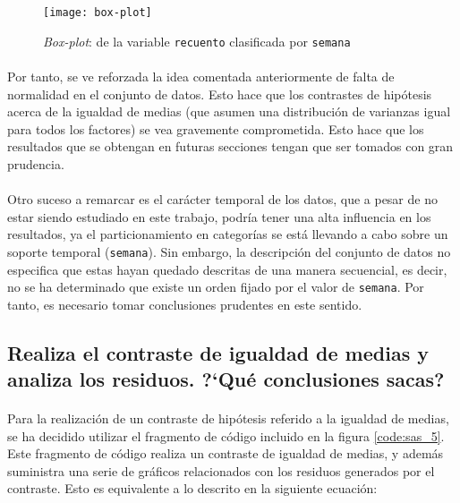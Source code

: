 \documentclass[11pt]{article}
\begin{document}
      \begin{figure}
        \centering
        \texttt{[image: box-plot]}
        \caption{\emph{Box-plot}: de la variable \texttt{recuento} clasificada por \texttt{semana}}
        \label{img:box-plot}
      \end{figure}

      \paragraph{}
      Por tanto, se ve reforzada la idea comentada anteriormente de falta de normalidad en el conjunto de datos. Esto hace que los contrastes de hipótesis acerca de la igualdad de medias (que asumen una distribución de varianzas igual para todos los factores) se vea gravemente comprometida. Esto hace que los resultados que se obtengan en futuras secciones tengan que ser tomados con gran prudencia.

      \paragraph{}
      Otro suceso a remarcar es el carácter temporal de los datos, que a pesar de no estar siendo estudiado en este trabajo, podría tener una alta influencia en los resultados, ya el particionamiento en categorías se está llevando a cabo sobre un soporte temporal (\texttt{semana}). Sin embargo, la descripción del conjunto de datos no especifica que estas hayan quedado descritas de una manera secuencial, es decir, no se ha determinado que existe un orden fijado por el valor de \texttt{semana}. Por tanto, es necesario tomar conclusiones prudentes en este sentido.

    \subsection{Realiza el contraste de igualdad de medias y analiza los residuos. ?`Qué conclusiones sacas?}
    \label{sec:e2}

      \paragraph{}
      Para la realización de un contraste de hipótesis referido a la igualdad de medias, se ha decidido utilizar el fragmento de código incluido en la figura \ref{code:sas_5}. Este fragmento de código realiza un contraste de igualdad de medias, y además suministra una serie de gráficos relacionados con los residuos generados por el contraste. Esto es equivalente a lo descrito en la siguiente ecuación:
\end{document}
